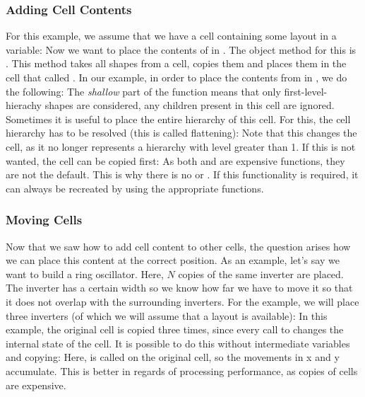\subsubsection{Adding Cell Contents}
For this example, we assume that we have a cell containing some layout in a variable:
Now we want to place the contents of  in .
The object method for this is .
This method takes all shapes from a cell, copies them and places them in the cell that called .
In our example, in order to place the contents from  in , we do the following:
The \emph{shallow} part of the function means that only first-level-hierachy shapes are considered, any children present in this cell are ignored.
Sometimes it is useful to place the entire hierarchy of this cell. For this, the cell hierarchy has to be resolved (this is called flattening):
Note that this changes the cell, as it no longer represents a hierarchy with level greater than 1.
If this is not wanted, the cell can be copied first:
As both  and  are expensive functions, they are not the default.
This is why there is no  or .
If this functionality is required, it can always be recreated by using the appropriate functions.

\subsubsection{Moving Cells}
Now that we saw how to add cell content to other cells, the question arises how we can place this content at the correct position.
As an example, let's say we want to build a ring oscillator. Here, $N$ copies of the same inverter are placed.
The inverter has a certain width so we know how far we have to move it so that it does not overlap with the surrounding inverters.
For the example, we will place three inverters (of which we will assume that a layout is available):
In this example, the original cell is copied three times, since every call to  changes the internal state of the cell.
It is possible to do this without intermediate variables and copying:
Here,  is called on the original cell, so the movements in x and y accumulate.
This is better in regards of processing performance, as copies of cells are expensive.

